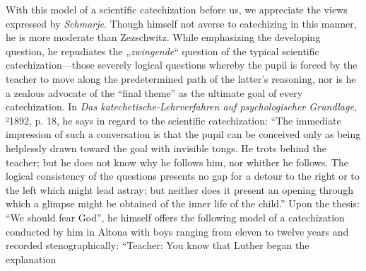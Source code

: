 With this model of a scientific catechization before us, we appreciate the views expressed by \emph{Schmarje}. Though himself not averse to catechizing in this manner, he is more moderate than Zezschwitz. While emphasizing the developing question, he repudiates the „\emph{zwingende}“ question of the typical scientific catechization—those severely logical questions whereby the pupil is forced by the teacher to move along the predetermined path of the latter’s reasoning, nor is he a zealous advocate of the “final theme” as the ultimate goal of every catechization. In \emph{Das katechetische-Lehrverfahren auf psychologischer Grundlage}, ²1892, p. 18, he says in regard to the scientific catechization: “The immediate impression of such a conversation is that the pupil can be conceived only as being helplessly drawn toward the goal with invisible tongs. He trots behind the teacher; but he does not know why he follows him, nor whither he follows. The logical consistency of the questions presents no gap for a detour to the right or to the left which might lead astray; but neither does it present an opening through which a glimpse might be obtained of the inner life of the child.” Upon the thesis: “We should fear God”, he himself offers the following model of a catechization conducted by him in Altona with boys ranging from eleven to twelve years and recorded stenographically: “Teacher: You know that Luther began the explanation
